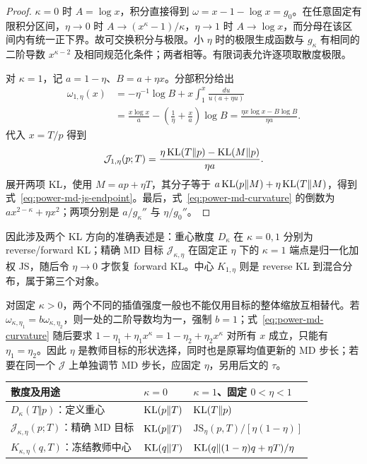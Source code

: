 \begin{proof}
$\kappa=0$ 时 $A=\log x$，积分直接得到 $\omega=x-1-\log x=g_0$。在任意固定有限积分区间，$\eta\to0$ 时 $A\to(x^\kappa-1)/\kappa$，$\eta\to1$ 时 $A\to\log x$，而分母在该区间内有统一正下界。故可交换积分与极限。小 $\eta$ 时的极限生成函数与 $g_\kappa$ 有相同的二阶导数 $x^{\kappa-2}$ 及相同规范化条件；两者相等。有限词表允许逐项取散度极限。

对 $\kappa=1$，记 $a=1-\eta$、$B=a+\eta x$。分部积分给出
\begin{align}
 \omega_{1,\eta}(x)
 &=-\eta^{-1}\log B+x\int_1^x\frac{du}{u(a+\eta u)}\\
 &=\frac{x\log x}{a}-\left(\frac1\eta+\frac xa\right)\log B
 =\frac{\eta x\log x-B\log B}{\eta a}.
\end{align}
代入 $x=T/p$ 得到
\begin{equation}
 \mathcal J_{1,\eta}(p;T)
 =\frac{\eta\operatorname{KL}(T\Vert p)-\operatorname{KL}(M\Vert p)}{\eta a}.
\end{equation}
展开两项 KL，使用 $M=ap+\eta T$，其分子等于 $a\operatorname{KL}(p\Vert M)+\eta\operatorname{KL}(T\Vert M)$，得到式~\eqref{eq:power-md-js-endpoint}。最后，式~\eqref{eq:power-md-curvature} 的倒数为 $a x^{2-\kappa}+\eta x^2$；两项分别是 $a/g_\kappa''$ 与 $\eta/g_0''$。
\end{proof}

因此涉及两个 KL 方向的准确表述是：重心散度 $D_\kappa$ 在 $\kappa=0,1$ 分别为 reverse/forward KL；精确 MD 目标 $\mathcal J_{\kappa,\eta}$ 在固定正 $\eta$ 下的 $\kappa=1$ 端点是归一化加权 JS，随后令 $\eta\to0$ 才恢复 forward KL。中心 $K_{1,\eta}$ 则是 reverse KL 到混合分布，属于第三个对象。

对固定 $\kappa>0$，两个不同的插值强度一般也不能仅用目标的整体缩放互相替代。若 $\omega_{\kappa,\eta_1}=b\omega_{\kappa,\eta_2}$，则一处的二阶导数均为一，强制 $b=1$；式~\eqref{eq:power-md-curvature} 随后要求 $1-\eta_1+\eta_1x^\kappa=1-\eta_2+\eta_2x^\kappa$ 对所有 $x$ 成立，只能有 $\eta_1=\eta_2$。因此 $\eta$ 是教师目标的形状选择，同时也是原幂均值更新的 MD 步长；若要在同一个 $\mathcal J$ 上单独调节 MD 步长，应固定 $\eta$，另用后文的 $\tau$。

\begin{center}
\small
\begin{tabular}{lll}
\toprule
散度及用途 & $\kappa=0$ & $\kappa=1$、固定 $0<\eta<1$\\
\midrule
$D_\kappa(T\Vert p)$：定义重心 & $\operatorname{KL}(p\Vert T)$ & $\operatorname{KL}(T\Vert p)$\\
$\mathcal J_{\kappa,\eta}(p;T)$：精确 MD 目标 & $\operatorname{KL}(p\Vert T)$ & $\mathrm{JS}_\eta(p,T)/[\eta(1-\eta)]$\\
$K_{\kappa,\eta}(q,T)$：冻结教师中心 & $\operatorname{KL}(q\Vert T)$ & $\operatorname{KL}(q\Vert(1-\eta)q+\eta T)/\eta$\\
\bottomrule
\end{tabular}
\end{center}

